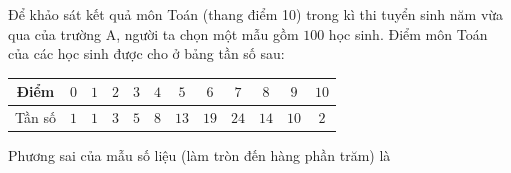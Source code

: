 \begin{ex}
Để khảo sát kết quả môn Toán (thang điểm 10) trong kì thi tuyển sinh năm vừa qua của trường A, người ta chọn một mẫu gồm $100$ học sinh. Điểm môn Toán của các học sinh được cho ở bảng tần số sau:
\begin{center}
\begin{tabular}{|c|c|c|c|c|c|c|c|c|c|c|c|}\hline
Điểm & $0$ & $1$ & $2$ & $3$ & $4$ & $5$ & $6$ & $7$ & $8$ & $9$ & $10$\\\hline
Tần số & $1$ & $1$ & $3$ & $5$ & $8$ & $13$ & $19$ & $24$ & $14$ & $10$ & $2$\\\hline
\end{tabular}
\end{center}
Phương sai của mẫu số liệu (làm tròn đến hàng phần trăm) là
\end{ex}

